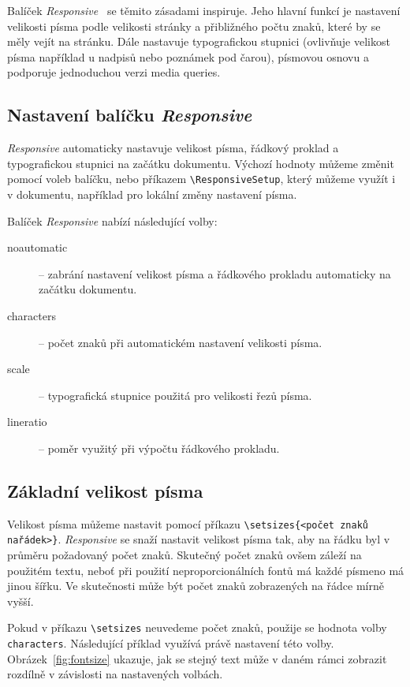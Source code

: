 \documentclass{csbulletin}
\newcommand\balicek[1]{\textit{#1}}
\begin{document}
Balíček \balicek{Responsive}~\cite{responsive} se těmito zásadami inspiruje. 
Jeho hlavní funkcí je nastavení velikosti písma podle velikosti stránky
a přibližného počtu znaků, které by se měly vejít na stránku. 
Dále nastavuje typografickou stupnici (ovlivňuje velikost písma například 
u nadpisů nebo poznámek pod čarou), písmovou osnovu a podporuje
jednoduchou verzi media queries.

\subsection{Nastavení balíčku \balicek{Responsive}}

\balicek{Responsive} automaticky nastavuje velikost písma, řádkový proklad
a typografickou stupnici na začátku dokumentu. Výchozí hodnoty můžeme změnit
pomocí voleb balíčku, nebo příkazem \verb|\ResponsiveSetup|, který můžeme 
využít i v dokumentu, například pro lokální změny nastavení písma. 

Balíček \balicek{Responsive} nabízí následující volby:

\begin{description}
  \item[noautomatic] – zabrání nastavení velikost písma a řádkového prokladu automaticky na začátku dokumentu.
  \item[characters] – počet znaků při automatickém nastavení velikosti písma.
  \item[scale] –  typografická stupnice použitá pro velikosti řezů písma.
  \item[lineratio] – poměr využitý při výpočtu řádkového prokladu.
\end{description}

\subsection{Základní velikost písma}

Velikost písma můžeme nastavit pomocí příkazu \verb|\setsizes{<počet znaků na|\allowbreak\verb|řádek>}|. 
\balicek{Responsive} se snaží nastavit velikost písma tak, aby na řádku byl v průměru
požadovaný počet znaků. Skutečný počet znaků ovšem záleží na použitém textu, 
neboť při použití neproporcionálních fontů má každé písmeno má jinou šířku. 
Ve skutečnosti může být počet znaků zobrazených na řádce mírně vyšší.

Pokud v příkazu \verb|\setsizes| neuvedeme počet znaků, použije se hodnota volby \texttt{characters}.
Následující příklad využívá právě nastavení této volby. Obrázek~\ref{fig:fontsize} 
ukazuje, jak se stejný text může v daném rámci zobrazit rozdílně v závislosti na
nastavených volbách.
\end{document}
